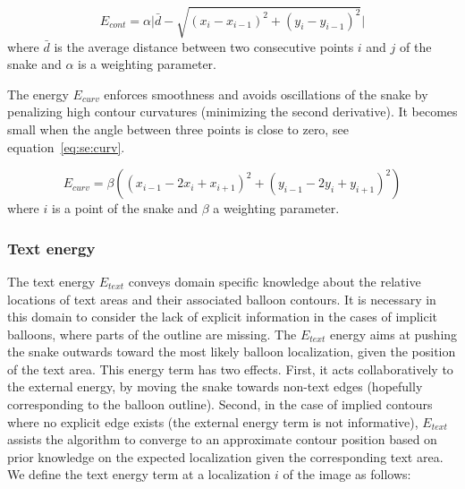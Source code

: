 \begin{equation}\label{eq:se:cont}
 E_{cont} = \alpha \Big|\bar{d} - \sqrt{(x_i - x_{i-1} )^2 + (y_i - y_{i-1} )^2}\Big|
\end{equation}
where $\bar{d}$ is the average distance between two consecutive points $i$ and $j$ of the snake and $\alpha$ is a weighting parameter.

The energy $E_{curv}$ enforces smoothness and avoids oscillations of the snake by penalizing high contour curvatures (minimizing the second derivative).
It becomes small when the angle between three points is close to zero, see equation~\ref{eq:se:curv}.

\begin{equation}\label{eq:se:curv}
  E_{curv} = \beta \left( (x_{i-1} - 2x_{i} + x_{i+1})^2 + (y_{i-1} - 2y_{i} + y_{i+1})^2 \right)
\end{equation}
where $i$ is a point of the snake and $\beta$ a weighting parameter.


\subsubsection{Text energy}
\label{sec:se:text_energie}

The text energy $E_{text}$ conveys domain specific knowledge about the relative locations of text areas and their associated balloon contours.
It is necessary in this domain to consider the lack of explicit information in the cases of implicit balloons, where parts of the outline are missing.
The $E_{text}$ energy aims at pushing the snake outwards toward the most likely balloon localization, given the position of the text area.
This energy term has two effects.
First, it acts collaboratively to the external energy, by moving the snake towards non-text edges (hopefully corresponding to the balloon outline).
Second, in the case of implied contours where no explicit edge exists (the external energy term is not informative), $E_{text}$ assists the algorithm to converge to an approximate contour position based on prior knowledge on the expected localization given the corresponding text area.
We define the text energy term at a localization $i$ of the image as follows:

